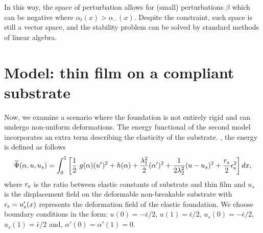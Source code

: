 % 
In this way, the space of perturbation allows for (small) perturbations $\beta$ which can be negative where $\alpha_t(x)>\alpha_-(x)$. Despite the constraint, such space is still a vector space, and the stability problem can be solved by standard methods of linear algebra.

\section{Model: thin film  on {a compliant} substrate }
\label{sec:non-rigid}
Now, we examine a scenario where the foundation is not entirely rigid and can undergo non-uniform deformations. The energy functional of the second model incorporates an extra term describing the elasticity of the substrate. , the energy is defined as follows
\begin{equation}
\label{model_elastic_substrate}
\widetilde{\Psi}(\alpha, u,u_s) = \int_{0}^1 \left[ \frac{1}{2} \ g(\alpha)(u')^2 + h(\alpha) + \frac{\lambda_1^2}{2}(\alpha')^2 
+ \frac{1}{2 \lambda_2^2} (u-u_s)^2 
+ \frac{r_{s}}{2}  \epsilon_{\rm s}^2 \right] dx,
\end{equation}
where $r_{\rm s}$ is the ratio between elastic constants of substrate and thin film and $u_s$ is the displacement field on the deformable non-breakable substrate with $\epsilon_{\rm s}=u_s'(x)$ represents the deformation field of the elastic foundation. We  choose boundary conditions in the form: $u(0)=-\bar\epsilon/2$, $u(1)=\bar\epsilon/2$,  $u_s(0)=-\bar\epsilon/2$, $u_s(1)=\bar\epsilon/2$ and, $\alpha'(0)=\alpha'(1)=0$. 

